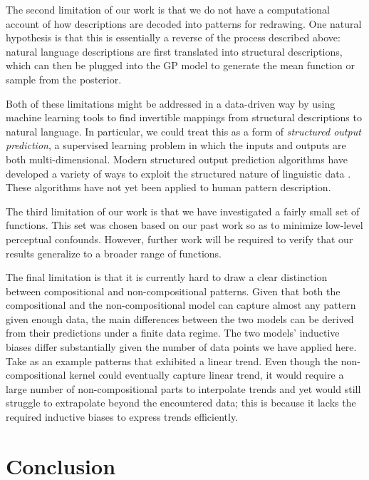 \documentclass[a4paper,man, floatsintext, natbib]{apa6}
\begin{document}
The second limitation of our work is that we do not have a computational account of how descriptions are decoded into patterns for redrawing. One natural hypothesis is that this is essentially a reverse of the process described above: natural language descriptions are first translated into structural descriptions, which can then be plugged into the GP model to generate the mean function or sample from the posterior.

Both of these limitations might be addressed in a data-driven way by using machine learning tools to find invertible mappings from structural descriptions to natural language. In particular, we could treat this as a form of \emph{structured output prediction}, a supervised learning problem in which the inputs and outputs are both multi-dimensional. Modern structured output prediction algorithms have developed a variety of ways to exploit the structured nature of linguistic data \citep[e.g.,][]{tsochantaridis2005large,daume2009search}. These algorithms have not yet been applied to human pattern description.

The third limitation of our work is that we have investigated a fairly small set of functions. This set was chosen based on our past work \citep{schulz2017compositional} so as to minimize low-level perceptual confounds. However, further work will be required to verify that our results generalize to a broader range of functions.

The final limitation is that it is currently hard to draw a clear distinction between compositional and non-compositional patterns. Given that both the compositional and the non-compositional model can capture almost any pattern given enough data, the main differences between the two models can be derived from their predictions under a finite data regime. The two models' inductive biases differ substantially given the number of data points we have applied here. Take as an example patterns that exhibited a linear trend. Even though the non-compositional kernel could eventually capture linear trend, it would require a large number of non-compositional parts to interpolate trends and yet would still struggle to extrapolate beyond the encountered data; this is because it lacks the required inductive biases to express trends efficiently.

\section{Conclusion}
\end{document}
